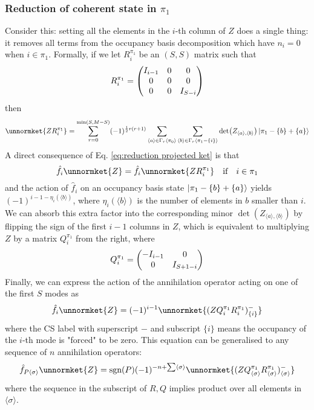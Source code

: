\documentclass[12pt]{article}
\newcommand{\sgn}{\text{sgn}}
\newcommand{\seq}[1]{\langle #1\rangle}
\begin{document}
	
	\subsubsection{Reduction of coherent state in $\pi_1$} \label{sec: reduction in pi 1}
	Consider this: setting all the elements in the $i$-th column of $Z$ does a single thing: it removes all terms from the occupancy basis decomposition which have $n_i=0$ when $i\in\pi_1$. Formally, if we let $R^{\pi_1}_i$ be an $(S,S)$ matrix such that
	\begin{equation}\label{eq:reduction projection}
	R^{\pi_1}_i=\mqty(\dmat[0]{I_{i-1}, 0, I_{S-i}})
	\end{equation}
	then
	\begin{equation} \label{eq:reduction projected ket}
	\unnormket{ZR^{\pi_1}_i}=\sum_{r=0}^{\min(S,M-S)}(-1)^{\frac{1}{2}r(r+1)}\sum_{\seq{a}\in\Gamma_r\seq{\pi_0}}\sum_{\seq{b}\in\Gamma_r\seq{\pi_1-\{i\}}}\det(Z_{\seq{a},\seq{b}})\ket{\pi_1-\{b\}+\{a\}}
	\end{equation}
	A direct consequence of Eq. \ref{eq:reduction projected ket} is that
	\begin{equation}
	\hat{f}_i\unnormket{Z}=\hat{f}_i\unnormket{ZR^{\pi_1}_i}\qq{if}i\in\pi_1
	\end{equation}
	and the action of $\hat{f}_i$ on an occupancy basis state $\ket{\pi_1-\{b\}+\{a\}}$ yields $(-1)^{i-1-\eta_i(\seq{b})}$, where $\eta_i(\seq{b})$ is the number of elements in $b$ smaller than $i$. We can absorb this extra factor into the corresponding minor $\det(Z_{\seq{a},\seq{b}})$ by flipping the sign of the first $i-1$ columns in $Z$, which is equivalent to multiplying $Z$ by a matrix $Q^{\pi_1}_i$ from the right, where
	\begin{equation}
	Q^{\pi_1}_i = \mqty(\dmat[0]{-I_{i-1},I_{S+1-i}})
	\end{equation}
	Finally, we can express the action of the annihilation operator acting on one of the first $S$ modes as
	\begin{equation}
	\hat{f}_i\unnormket{Z}=(-1)^{i-1}\unnormket{(ZQ^{\pi_1}_iR^{\pi_1}_i)^-_{\{i\}}}
	\end{equation}
	where the CS label with superscript $-$ and subscript $\{i\}$ means the occupancy of the $i$-th mode is "forced" to be zero. This equation can be generalised to any sequence of $n$ annihilation operators:
	\begin{equation} \label{eq:effect of pi_1 lowering operator}
	\hat{f}_{P\seq{\sigma}}\unnormket{Z}=\sgn(P)(-1)^{-n+\sum\seq{\sigma}}\unnormket{(ZQ^{\pi_1}_{\seq{\sigma}}R^{\pi_1}_{\seq{\sigma}})^{-}_{\seq{\sigma}}}
	\end{equation}
	where the sequence in the subscript of $R, Q$ implies product over all elements in $\seq{\sigma}$.
	
\end{document}
